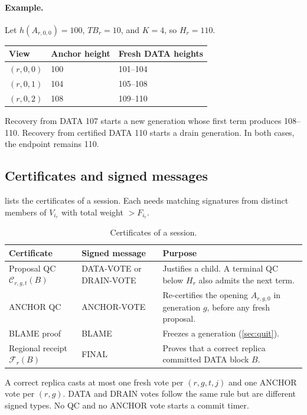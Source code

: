 \documentclass[11pt,a4paper]{article}
\newcommand{\QC}{\mathcal C}
\newcommand{\FC}{\mathcal F}
\newcommand{\TB}{\mathit{TB}}
\begin{document}
\paragraph{Example.}
Let $h(A_{r,0,0})=100$, $\TB_r=10$, and $K=4$, so $H_r=110$.
\begin{center}\small
\begin{tabular}{@{}lll@{}}\toprule
View & Anchor height & Fresh DATA heights\\\midrule
$(r,0,0)$ & 100 & 101--104\\
$(r,0,1)$ & 104 & 105--108\\
$(r,0,2)$ & 108 & 109--110\\\bottomrule
\end{tabular}
\end{center}
Recovery from DATA 107 starts a new generation whose first term produces
108--110. Recovery from certified DATA 110 starts a drain generation.
In both cases, the endpoint remains 110.

\subsection{Certificates and signed messages}
\label{sec:certificates}
 lists the certificates of a session. Each needs
matching signatures from distinct members of $V_{i_r}$ with total weight
$>F_{i_r}$.

\begin{table}[htbp]\centering\small
\caption{Certificates of a session.}
\label{tab:certificates}
\begin{tabularx}{\linewidth}{@{}>{\raggedright\arraybackslash}p{.25\linewidth}>{\raggedright\arraybackslash}p{.24\linewidth}Y@{}}
\toprule
Certificate & Signed message & Purpose\\
\midrule
Proposal QC $\QC_{r,g,t}(B)$ & DATA-VOTE or DRAIN-VOTE & Justifies a
child. A terminal QC below $H_r$ also admits the next term.\\
ANCHOR QC & ANCHOR-VOTE & Re-certifies the opening $A_{r,g,0}$ in
generation $g$, before any fresh proposal.\\
BLAME proof & BLAME & Freezes a generation (\cref{sec:quit}).\\
Regional receipt $\FC_r(B)$ & FINAL & Proves that a correct replica
committed DATA block $B$.\\
\bottomrule
\end{tabularx}
\end{table}

A correct replica casts at most one fresh vote per $(r,g,t,j)$ and one
ANCHOR vote per $(r,g)$. DATA and DRAIN votes follow the same rule but
are different signed types. No QC and no ANCHOR vote starts a commit
timer.
\end{document}
